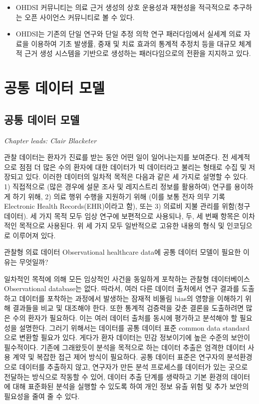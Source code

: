 \documentclass[10.5pt]{book}
\theoremstyle{definition}
\theoremstyle{definition}
\theoremstyle{definition}
\theoremstyle{remark}
\let\BeginKnitrBlock\begin \let\EndKnitrBlock\end
\begin{document}
\BeginKnitrBlock{rmdsummary}
\begin{itemize}
\item
  OHDSI 커뮤니티는 의료 근거 생성의 상호 운용성과 재현성을 적극적으로
  추구하는 오픈 사이언스 커뮤니티로 볼 수 있다.
\item
  OHDSI는 기존의 단일 연구와 단일 추정 의학 연구 패러다임에서 실세계
  의료 자료을 이용하여 기초 발생률, 중재 및 치료 효과의 통계적 추정치
  등을 대규모 체계적 근거 생성 시스템을 기반으로 생성하는 패러다임으로의
  전환을 지지하고 있다.
\end{itemize}
\EndKnitrBlock{rmdsummary}

\part{공통 데이터 모델}\label{part---}

\chapter{공통 데이터 모델}\label{CommonDataModel}

\emph{Chapter leads: Clair Blacketer}

관찰 데이터는 환자가 진료를 받는 동안 어떤 일이 일어나는지를 보여준다.
전 세계적으로 점점 더 많은 수의 환자에 대한 데이터가 빅 데이터라고
불리는 형태로 수집 및 저장되고 있다. 이러한 데이터의 일차적 목적은
다음과 같은 세 가지로 설명할 수 있다. 1) 직접적으로 (많은 경우에 설문
조사 및 레지스트리 정보를 활용하여) 연구를 용이하게 하기 위해, 2) 의료
행위 수행을 지원하기 위해 (이를 보통 전자 의무 기록 Electronic Health
Records(EHR)이라고 함), 또는 3) 의료비 지불 관리를 위함(청구 데이터). 세
가지 목적 모두 임상 연구에 보편적으로 사용되나, 두, 세 번째 항목은
이차적인 목적으로 사용된다. 위 세 가지 모두 일반적으로 고유한 내용의
형식 및 인코딩으로 이루어져 있다. 

관찰형 의료 데이터 Observational healthcare data에 공통 데이터 모델이
필요한 이유는 무엇일까?

일차적인 목적에 의해 모든 임상적인 사건을 동일하게 포착하는 관찰형
데이터베이스 Observational database는 없다. 따라서, 여러 다른 데이터
출처에서 연구 결과를 도출하고 데이터를 포착하는 과정에서 발생하는 잠재적
비뚤림 bias의 영향을 이해하기 위해 결과들을 비교 및 대조해야 한다. 또한
통계적 검증력을 갖춘 결론을 도출하려면 많은 수의 환자가 필요하다. 이는
여러 데이터 출처를 동시에 평가하고 분석해야 할 필요성을 설명한다. 그러기
위해서는 데이터를 공통 데이터 표준 common data standard으로 변환할
필요가 있다. 게다가 환자 데이터는 민감 정보이기에 높은 수준의 보안이
필수적이다. 기존에 그래왔듯이 분석을 목적으로 하는 데이터 추출은 엄격한
데이터 사용 계약 및 복잡한 접근 제어 방식이 필요하다. 공통 데이터 표준은
연구자의 분석환경으로 데이터를 추출하지 않고, 연구자가 만든 분석
프로세스를 데이터가 있는 곳으로 전달하는 방식으로 작동할 수 있어, 데이터
추출 단계를 생략하고 기본 환경의 데이터에 대해 표준화된 분석을 실행할 수
있도록 하여 개인 정보 유출 위험 및 추가 보안의 필요성을 줄여 줄 수 있다.
\end{document}
